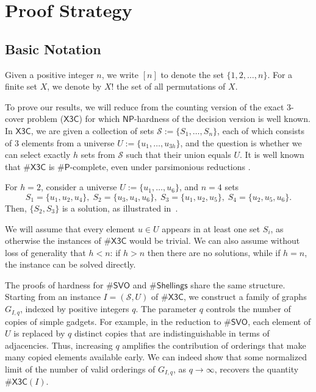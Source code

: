 \documentclass[11pt]{amsart}
\begin{document}
\section{Proof Strategy} \label{sec:strategy}

\subsection{Basic Notation}
Given a positive integer $n$, we write $[n]$ to denote the set $\{1, 2, \dots, n\}$. For a finite set $X$, we denote by $X!$ the set of all permutations of $X$. 

\vspace{1em}

To prove our results, we will reduce from the counting version of the exact 3-cover problem ($\mathsf{X3C}$) for which $\mathsf{NP}$-hardness of the decision version is well known. In $\mathsf{X3C}$, we are given a collection of sets $\mathcal{S} := \{S_1, \dots, S_n\}$, each of which consists of $3$ elements from a universe $U := \{u_1, \dots, u_{3h}\}$, and the question is whether we can select exactly $h$ sets from $\mathcal{S}$ such that their union equals $U$. It is well known that $\#\mathsf{X3C}$ is $\#\mathsf{P}$-complete, even under parsimonious reductions \cite{X3C}.
\begin{ex}\label{ex:x3c}For $h=2$, consider a universe $U := \{u_1, \ldots, u_6\}$, and $n=4$ sets
\[
    S_1 = \{u_1, u_2, u_4\}, \; S_2 = \{u_3, u_4, u_6\}, \; S_3 = \{u_1, u_2, u_5\}, \; S_4 = \{u_2, u_5, u_6\}.
\]
Then, $\{S_2, S_3\}$ is a solution, as illustrated in~.
\end{ex}

We will assume that every element $u \in U$ appears in at least one set $S_i$, as otherwise the instances of $\#\mathsf{X3C}$ would be trivial. We can also assume without loss of generality that $h < n$: if $h > n$ then there are no solutions, while if $h = n$, the instance can be solved directly.

The proofs of hardness for $\#\mathsf{SVO}$ and $\#\mathsf{Shellings}$ share the same structure. Starting from an instance $I = (\mathcal{S}, U)$ of $\#\mathsf{X3C}$, we construct a family of graphs $G_{I, q}$, indexed by positive integers $q$. The parameter $q$ controls the number of copies of simple gadgets. For example, in the reduction to $\#\mathsf{SVO}$, each element of $U$ is replaced by $q$ distinct copies that are indistinguishable in terms of adjacencies. Thus, increasing $q$ amplifies the contribution of orderings that make many copied elements available early. We can indeed show that some normalized limit of the number of valid orderings of $G_{I, q}$, as $q \to \infty$, recovers the quantity $\#\mathsf{X3C}(I)$.
\end{document}
